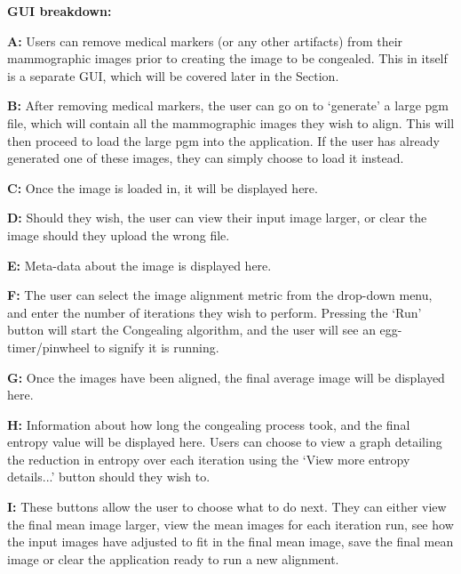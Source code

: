 \vspace{2cm}

\noindent \textbf{\acrshort{GUI} breakdown: }

\noindent \textbf{ A: } Users can remove medical markers (or any other artifacts) from their mammographic images prior to creating the image to be congealed. This in itself is a separate \acrshort{GUI}, which will be covered later in the Section.

\noindent \textbf{ B: } After removing medical markers, the user can go on to `generate' a large pgm file, which will contain all the mammographic images they wish to align. This will then proceed to load the large pgm into the application. If the user has already generated one of these images, they can simply choose to load it instead.

\noindent \textbf{ C: } Once the image is loaded in, it will be displayed here.

\noindent \textbf{ D: } Should they wish, the user can view their input image larger, or clear the image should they upload the wrong file.

\noindent \textbf{ E: } Meta-data about the image is displayed here.

\noindent \textbf{ F: } The user can select the image alignment metric from the drop-down menu, and enter the number of iterations they wish to perform. Pressing the `Run' button will start the \Gls{Congealing} algorithm, and the user will see an egg-timer/pinwheel to signify it is running.

\noindent \textbf{ G: } Once the images have been aligned, the final average image will be displayed here.

\noindent \textbf{ H: } Information about how long the congealing process took, and the final entropy value will be displayed here. Users can choose to view a graph detailing the reduction in entropy over each iteration using the `View more entropy details...' button should they wish to.

\noindent \textbf{ I: } These buttons allow the user to choose what to do next. They can either view the final mean image larger, view the mean images for each iteration run, see how the input images have adjusted to fit in the final mean image, save the final mean image or clear the application ready to run a new alignment.

